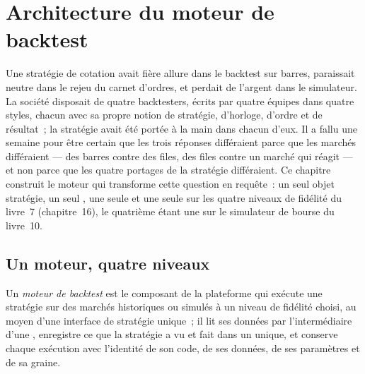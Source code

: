 \chapter{Architecture du moteur de backtest}\label{ch:pl:backtest-engine-architecture}

Une stratégie de cotation avait fière allure dans le backtest sur barres, paraissait neutre dans le rejeu du carnet d'ordres, et perdait de l'argent dans le simulateur. La société disposait de
quatre backtesters, écrits par quatre équipes dans quatre styles, chacun avec sa propre notion de stratégie, d'horloge, d'ordre et de résultat~; la stratégie avait été portée
à la main dans chacun d'eux. Il a fallu une semaine pour être certain que les trois réponses différaient parce que les marchés différaient
--- des barres contre des files, des files contre un marché qui réagit --- et non parce que les quatre portages de la stratégie différaient. Ce chapitre
construit le moteur qui transforme cette question en requête~: un seul objet stratégie, un seul , une seule  et une seule 
sur les quatre niveaux de fidélité du livre~7 (chapitre~16), le quatrième étant une  sur le simulateur de bourse
du livre~10.

\section{Un moteur, quatre niveaux}

\begin{definition}\label{def:pl:backtest-engine-architecture:engine}
Un \emph{moteur de backtest} est le composant de la plateforme qui exécute une stratégie sur des marchés historiques ou simulés
à un niveau de fidélité choisi, au moyen d'une interface de stratégie unique~; il lit ses données par l'intermédiaire d'une , enregistre ce que la stratégie a vu et fait
dans un  unique, et conserve chaque exécution avec l'identité de son code, de ses données, de ses paramètres et de sa graine.
\end{definition}

